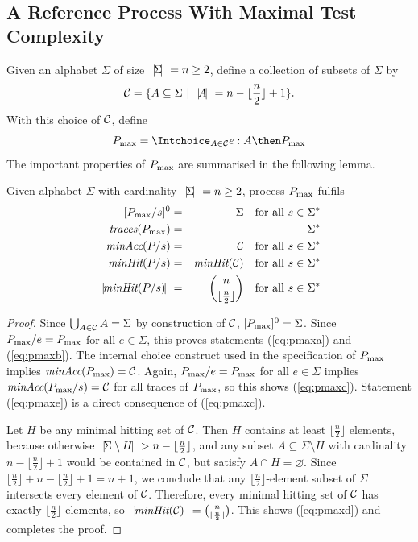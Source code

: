 \subsection{A Reference Process With Maximal Test Complexity}

Given an alphabet $\Sigma$ of size ${~|\! \Sigma\!|~} = n\ge 2$, define
a collection of subsets of $\Sigma$ by
\[
{\cal C} = \{ A\subseteq\Sigma~|~{~|\! A\!|~} = n - \lfloor\frac{n}{2}\rfloor + 1 \}.
\]
%
With this choice of ${\cal C}$, define
\begin{equation}\label{eq:pmax}
\pmax = \Intchoice_{A\in{\cal C}} e:A\then \pmax
\end{equation}
%
The important properties of $P_\text{max}$ are summarised in the following lemma.
%
\begin{lemma}\label{lemma:pmax}
Given alphabet $\Sigma$ with cardinality ${~|\! \Sigma\!|~} = n\ge 2$,
process $P_\text{max}$ fulfils
%
\begin{eqnarray}
{}[P_\text{max}/s]^0 & = & \Sigma \quad\text{for all $s\in \Sigma^*$}
\label{eq:pmaxa}
\\
\text{\it traces}(P_\text{max}) & = & \Sigma^*
\label{eq:pmaxb}
\\
\text{\it minAcc}(P/s) & = & {\cal C} \quad\text{for all $s\in \Sigma^*$}
\label{eq:pmaxc}
\\
\text{\it minHit}(P/s) & = & \text{\it minHit}({\cal C}) \quad\text{for all $s\in \Sigma^*$}
\label{eq:pmaxe}
\\
{~|\! \text{\it minHit}(P/s)\!|~} & = & \binom{n}{\lfloor\frac{n}{2}\rfloor} 
\quad \text{for all $s\in \Sigma^*$}
\label{eq:pmaxd}
\end{eqnarray}
\end{lemma}
\begin{proof}
 Since  
$
\bigcup_{A\in{\cal C}} A = \Sigma
$
by construction of ${\cal C}$, $[P_\text{max}]^0 = \Sigma$. Since $P_\text{max}/e = P_\text{max}$ for all
$e\in\Sigma$, this proves statements (\ref{eq:pmaxa}) and (\ref{eq:pmaxb}).
The internal choice construct used in the specification of $P_\text{max}$ implies
$\text{\it minAcc}(P_\text{max}) = {\cal C}$. Again, $P_\text{max}/e = P_\text{max}$ for all
$e\in\Sigma$ implies $\text{\it minAcc}(P_\text{max}/s) = {\cal C}$ for all traces of $P_\text{max}$, so this shows (\ref{eq:pmaxc}). Statement (\ref{eq:pmaxe}) is a direct consequence
of (\ref{eq:pmaxc}).

Let $H$ be any minimal hitting set of ${\cal C}$. Then
$H$ contains at least $\lfloor{\frac{n}{2}}\rfloor$ elements, because
otherwise ${~|\! \Sigma\setminus H\!|~} > n-\lfloor{\frac{n}{2}}\rfloor$, and any
subset $A\subseteq \Sigma\setminus H$ with cardinality
$n-\lfloor{\frac{n}{2}}\rfloor+1$  would be contained in ${\cal C}$, but satisfy
$A\cap H=\varnothing$. Since
$\lfloor{\frac{n}{2}}\rfloor+n-\lfloor{\frac{n}{2}}\rfloor+1=n+1$, we
conclude
 that any $\lfloor{\frac{n}{2}}\rfloor$-element subset of $\Sigma$
 intersects  every element of ${\cal C}$.  Therefore, every minimal hitting set of ${\cal C}$ has exactly $\lfloor{\frac{n}{2}}\rfloor$ elements,
so ${~|\! \text{\it minHit}({\cal C})\!|~} = \binom{n}{\lfloor{\frac{n}{2}}\rfloor}$. This 
shows  (\ref{eq:pmaxd}) and completes the proof.
\xbox
\end{proof}

